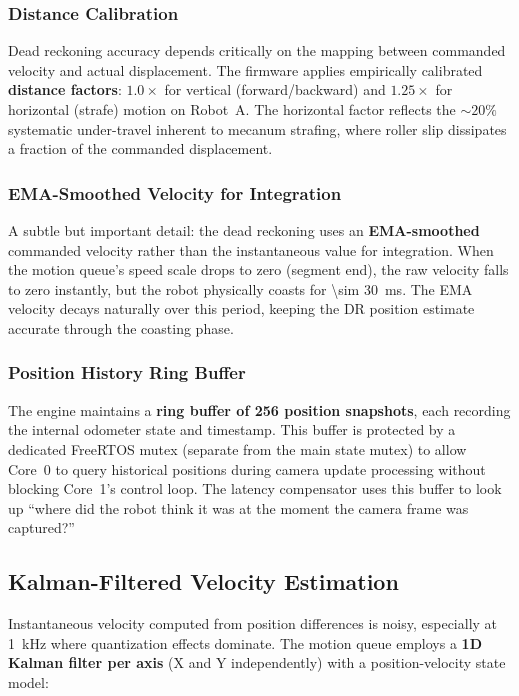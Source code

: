 \documentclass[12pt, a4paper, twoside]{article}
\begin{document}
\subsubsection{Distance Calibration}

Dead reckoning accuracy depends critically on the mapping between commanded velocity and actual displacement. The firmware applies empirically calibrated \textbf{distance factors}: $1.0 \times$ for vertical (forward/backward) and $1.25 \times$ for horizontal (strafe) motion on Robot~A. The horizontal factor reflects the $\sim 20\%$ systematic under-travel inherent to mecanum strafing, where roller slip dissipates a fraction of the commanded displacement.

\subsubsection{EMA-Smoothed Velocity for Integration}

A subtle but important detail: the dead reckoning uses an \textbf{EMA-smoothed} commanded velocity rather than the instantaneous value for integration. When the motion queue's speed scale drops to zero (segment end), the raw velocity falls to zero instantly, but the robot physically coasts for \SI{\sim 30}{\milli\second}. The EMA velocity decays naturally over this period, keeping the DR position estimate accurate through the coasting phase.

\subsubsection{Position History Ring Buffer}

The engine maintains a \textbf{ring buffer of 256 position snapshots}, each recording the internal odometer state and timestamp. This buffer is protected by a dedicated FreeRTOS mutex (separate from the main state mutex) to allow Core~0 to query historical positions during camera update processing without blocking Core~1's control loop. The latency compensator uses this buffer to look up ``where did the robot think it was at the moment the camera frame was captured?''

\subsection{Kalman-Filtered Velocity Estimation}
\label{sec:kalman}

Instantaneous velocity computed from position differences is noisy, especially at \SI{1}{\kilo\hertz} where quantization effects dominate. The motion queue employs a \textbf{1D Kalman filter per axis} (X and Y independently) with a position-velocity state model:
\end{document}
